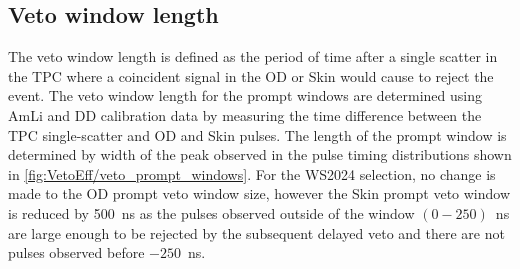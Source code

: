\subsection{Veto window length}\label{sec:VetoEff/VetoWindowLength}
The veto window length is defined as the period of time after a single scatter in the TPC where a coincident signal in the OD or Skin would cause to reject the event.
The veto window length for the prompt windows are determined using AmLi and DD calibration data by measuring the time difference between the TPC single-scatter and OD and Skin pulses. The length of the prompt window is determined by width of the peak observed in the pulse timing distributions shown in \autoref{fig:VetoEff/veto_prompt_windows}. For the WS2024 selection, no change is made to the OD prompt veto window size, however the Skin prompt veto window is reduced by 500~ns as the pulses observed outside of the window $(0-250)$~ns are large enough to be rejected by the subsequent delayed veto and there are not pulses observed before $-250$~ns.
